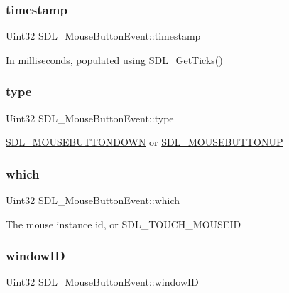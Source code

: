 \subsubsection{\texorpdfstring{timestamp}{timestamp}}
{\footnotesize\ttfamily Uint32 S\+D\+L\+\_\+\+Mouse\+Button\+Event\+::timestamp}

In milliseconds, populated using \hyperlink{SDL__timer_8h_a0b9bc71d6287e0ffafdc3419760fe2b3}{S\+D\+L\+\_\+\+Get\+Ticks()} \mbox{\label{structSDL__MouseButtonEvent_af64cb09ea68b8081ecc8ee498552e3d7}} 
\subsubsection{\texorpdfstring{type}{type}}
{\footnotesize\ttfamily Uint32 S\+D\+L\+\_\+\+Mouse\+Button\+Event\+::type}

\hyperlink{SDL__events_8h_a3b589e89be6b35c02e0dd34a55f3fccaa9267166e1536dfa8b0daa98c0afa9052}{S\+D\+L\+\_\+\+M\+O\+U\+S\+E\+B\+U\+T\+T\+O\+N\+D\+O\+WN} or \hyperlink{SDL__events_8h_a3b589e89be6b35c02e0dd34a55f3fccaa4ab85278398d29b9e50f500aad2b952b}{S\+D\+L\+\_\+\+M\+O\+U\+S\+E\+B\+U\+T\+T\+O\+N\+UP} \mbox{\label{structSDL__MouseButtonEvent_a366aef59a0f393afc8a3561e741825df}} 
\subsubsection{\texorpdfstring{which}{which}}
{\footnotesize\ttfamily Uint32 S\+D\+L\+\_\+\+Mouse\+Button\+Event\+::which}

The mouse instance id, or S\+D\+L\+\_\+\+T\+O\+U\+C\+H\+\_\+\+M\+O\+U\+S\+E\+ID \mbox{\label{structSDL__MouseButtonEvent_ab3b855d4b543b5d02fcf5d56e4421393}} 
\subsubsection{\texorpdfstring{window\+ID}{windowID}}
{\footnotesize\ttfamily Uint32 S\+D\+L\+\_\+\+Mouse\+Button\+Event\+::window\+ID}

